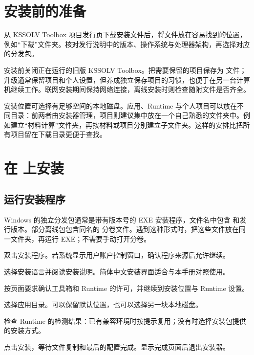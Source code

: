\section{安装前的准备}

从 KSSOLV Toolbox 项目发行页下载安装文件后，将文件放在容易找到的位置，例如“下载”文件夹。核对发行说明中的版本、操作系统与处理器架构，再选择对应的分发包。

安装前关闭正在运行的旧版 KSSOLV Toolbox。把需要保留的项目保存为  文件；升级通常保留项目和个人设置，但养成独立保存项目的习惯，也便于在另一台计算机继续工作。联网安装期间保持网络连接，离线安装时则检查随附文件是否齐全。

安装位置可选择有足够空间的本地磁盘。应用、Runtime 与个人项目可以放在不同目录：前两者由安装器管理，项目则建议集中放在一个自己熟悉的文件夹中。例如建立“材料计算”文件夹，再按材料或项目分别建立子文件夹。这样的安排比把所有项目留在下载目录更便于查找。


\section{在  上安装}

\subsection{运行安装程序}

Windows 的独立分发包通常是带有版本号的 EXE 安装程序，文件名中包含  和发行版本。部分离线包包含同名的  分卷文件。遇到这种形式时，把这些文件放在同一文件夹，再运行 EXE；不需要手动打开分卷。

\begin{steps}
\item 双击安装程序。若系统显示用户账户控制窗口，确认程序来源后允许继续。
\item 选择安装语言并阅读安装说明。简体中文安装界面适合与本手册对照使用。
\item 按页面要求确认工具箱和 Runtime 的许可，并继续到安装位置与 Runtime 设置。
\item 选择应用目录。可以保留默认位置，也可以选择另一块本地磁盘。
\item 检查 Runtime 的检测结果：已有兼容环境时按提示复用；没有时选择安装包提供的安装方式。
\item 点击安装，等待文件复制和最后的配置完成。显示完成页面后退出安装器。
\end{steps}

